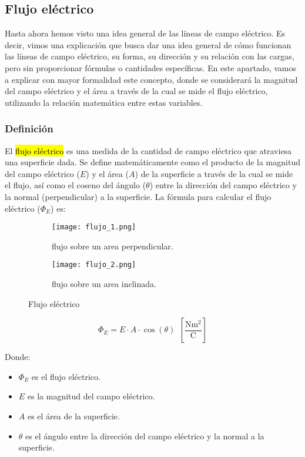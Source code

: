 \subsection{Flujo eléctrico}
\label{sec:flujo_electrico}

Hasta ahora hemos visto una idea general de las líneas de campo eléctrico. Es decir, vimos una explicación que busca dar una idea general de cómo funcionan las líneas de campo eléctrico, su forma, su dirección y su relación con las cargas, pero sin proporcionar fórmulas o cantidades específicas. En este apartado, vamos a explicar con mayor formalidad este concepto, donde se considerará la magnitud del campo eléctrico y el área a través de la cual se mide el flujo eléctrico, utilizando la relación matemática entre estas variables.

\subsubsection{Definición}

El \hl{flujo eléctrico} es una medida de la cantidad de campo eléctrico que atraviesa una superficie dada. Se define matemáticamente como el producto de la magnitud del campo eléctrico (\(E\)) y el área (\(A\)) de la superficie a través de la cual se mide el flujo, así como el coseno del ángulo (\(\theta\)) entre la dirección del campo eléctrico y la normal (perpendicular) a la superficie. La fórmula para calcular el flujo eléctrico (\(\Phi_E\)) es:

\begin{figure}[ht]
    \centering
    \begin{subfigure}[b]{0.45\textwidth}
        \centering
        \texttt{[image: flujo\_1.png]}
        \caption{flujo sobre un area perpendicular.}
        \label{fig:flujo1}
    \end{subfigure}
    \hfill
    \begin{subfigure}[b]{0.45\textwidth}
        \centering
        \texttt{[image: flujo\_2.png]}
        \caption{flujo sobre un area inclinada.}
        \label{fig:flujo2}
    \end{subfigure}
    \caption{Flujo eléctrico}
    \label{fig:flujo eléctrico}
\end{figure}

\[
\Phi_E = E \cdot A \cdot \cos(\theta)  ~~ \left[\frac{\si{\newton \meter \squared}}{\si{\coulomb}}\right]
\]

Donde:
\begin{itemize}
    \item \(\Phi_E\) es el flujo eléctrico.
    \item \(E\) es la magnitud del campo eléctrico.
    \item \(A\) es el área de la superficie.
    \item \(\theta\) es el ángulo entre la dirección del campo eléctrico y la normal a la superficie.
\end{itemize}

